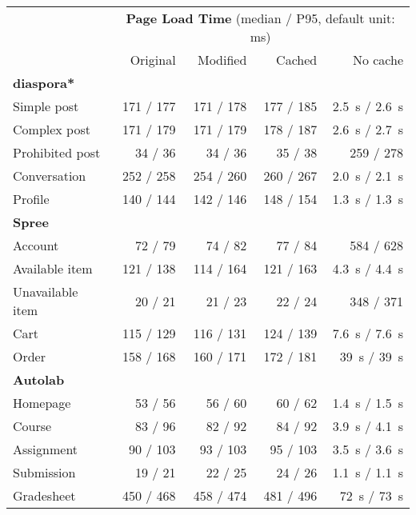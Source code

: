 \begin{tabular}{lrrrr}
\toprule
& \multicolumn{4}{c}{\textbf{Page Load Time} (median / P95, default unit: ms)} \\
\cmidrule(lr){2-5}
& Original & Modified & Cached & No cache \\ \midrule
\textbf{diaspora*}\\
    \quad{}Simple post & 171 / 177 & 171 / 178 & 177 / 185 & \SI{2.5}{s} / \SI{2.6}{s} \\ %
    \quad{}Complex post & 171 / 179 & 171 / 179 & 178 / 187 & \SI{2.6}{s} / \SI{2.7}{s} \\ %
    \quad{}Prohibited post & 34 / 36 & 34 / 36 & 35 / 38 & 259 / 278 \\
    \quad{}Conversation & 252 / 258 & 254 / 260 & 260 / 267 & \SI{2.0}{s} / \SI{2.1}{s} \\ %
    \quad{}Profile & 140 / 144 & 142 / 146 & 148 / 154 & \SI{1.3}{s} / \SI{1.3}{s} \\ %
\textbf{Spree}\\
    \quad{}Account & 72 / 79 & 74 / 82 & 77 / 84 & 584 / 628 \\
    \quad{}Available item & 121 / 138 & 114 / 164 & 121 / 163 & \SI{4.3}{s} / \SI{4.4}{s} \\ %
    \quad{}Unavailable item & 20 / 21 & 21 / 23 & 22 / 24 & 348 / 371 \\
    \quad{}Cart & 115 / 129 & 116 / 131 & 124 / 139 & \SI{7.6}{s} / \SI{7.6}{s} \\ %
    \quad{}Order & 158 / 168 & 160 / 171 & 172 / 181 & \SI{39}{s} / \SI{39}{s} \\ %
\textbf{Autolab}\\
    \quad{}Homepage & 53 / 56 & 56 / 60 & 60 / 62 & \SI{1.4}{s} / \SI{1.5}{s} \\ %
    \quad{}Course & 83 / 96 & 82 / 92 & 84 / 92 & \SI{3.9}{s} / \SI{4.1}{s} \\ %
    \quad{}Assignment & 90 / 103 & 93 / 103 & 95 / 103 & \SI{3.5}{s} / \SI{3.6}{s} \\ %
    \quad{}Submission & 19 / 21 & 22 / 25 & 24 / 26 & \SI{1.1}{s} / \SI{1.1}{s} \\ %
    \quad{}Gradesheet & 450 / 468 & 458 / 474 & 481 / 496 & \SI{72}{s} / \SI{73}{s} \\ %
\bottomrule
\end{tabular}
